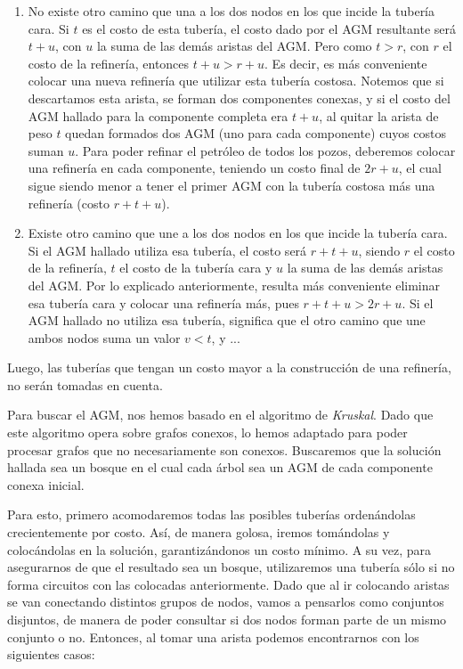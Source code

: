 \begin{enumerate}
	\item No existe otro camino que una a los dos nodos en los que incide la tubería cara. Si $t$ es el costo de esta tubería, el costo dado por el AGM resultante será $t + u$, con $u$ la suma de las demás aristas del AGM.  Pero como $t > r$, con $r$ el costo de la refinería, entonces $t + u > r + u$.  Es decir, es más conveniente colocar una nueva refinería que utilizar esta tubería costosa. Notemos que si descartamos esta arista, se forman dos componentes conexas, y si el costo del AGM hallado para la componente completa era $t + u$, al quitar la arista de peso $t$ quedan formados dos AGM (uno para cada componente) cuyos costos suman $u$. Para poder refinar el petróleo de todos los pozos, deberemos colocar una refinería en cada componente, teniendo un costo final de $2r + u$, el cual sigue siendo menor a tener el primer AGM con la tubería costosa más una refinería (costo $r + t + u$). 
	\item Existe otro camino que une a los dos nodos en los que incide la tubería cara. Si el AGM hallado utiliza esa tubería, el costo será $r + t + u$, siendo $r$ el costo de la refinería, $t$ el costo de la tubería cara y $u$ la suma de las demás aristas del AGM. Por lo explicado anteriormente, resulta más conveniente eliminar esa tubería cara y colocar una refinería más, pues $r + t + u > 2r + u$.  Si el AGM hallado no utiliza esa tubería, significa que el otro camino que une ambos nodos suma un valor $v < t$, y ...
	

\end{enumerate}

Luego, las tuberías que tengan un costo mayor a la construcción de una refinería, no serán tomadas en cuenta.

Para buscar el AGM, nos hemos basado en el algoritmo de {\it Kruskal}.  Dado que este algoritmo opera sobre grafos conexos, lo hemos adaptado para poder procesar grafos que no necesariamente son conexos. Buscaremos que la solución hallada sea un bosque en el cual cada árbol sea un AGM de cada componente conexa inicial.

Para esto, primero acomodaremos todas las posibles tuberías ordenándolas crecientemente por costo. Así, de manera golosa, iremos tomándolas y colocándolas en la solución, garantizándonos un costo mínimo. A su vez, para asegurarnos de que el resultado sea un bosque, utilizaremos una tubería sólo si no forma circuitos con las colocadas anteriormente. Dado que al ir colocando aristas se van conectando distintos grupos de nodos, vamos a pensarlos como conjuntos disjuntos, de manera de poder consultar si dos nodos forman parte de un mismo conjunto o no.  Entonces, al tomar una arista podemos encontrarnos con los siguientes casos:

